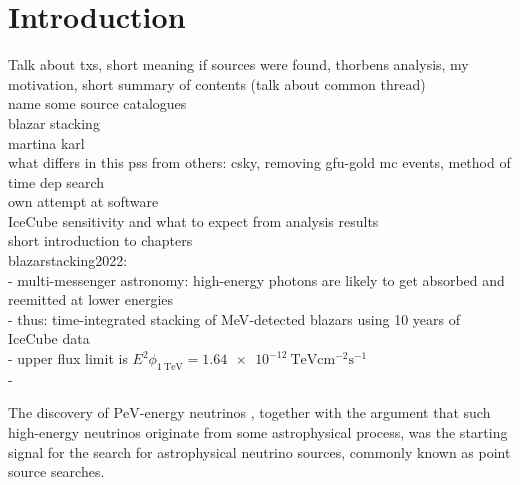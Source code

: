 \chapter{Introduction}
Talk about txs, short meaning if sources were found, thorbens analysis, my motivation, short summary of contents (talk about common thread)\\

name some source catalogues\\
blazar stacking\\
martina karl\\
what differs in this pss from others: csky, removing gfu-gold mc events, method of time dep search\\
own attempt at software\\
IceCube sensitivity and what to expect from analysis results\\
short introduction to chapters\\

blazarstacking2022:\\
- multi-messenger astronomy: high-energy photons are likely to get absorbed and reemitted at lower energies\\
- thus: time-integrated stacking of MeV-detected blazars using 10 years of IceCube data\\
- upper flux limit is $E^2\phi_{\SI{1}{\tera\electronvolt}}=\SI{1.64e-12}{\tera\electronvolt\centi\meter\tothe{-2}\second\tothe{-1}}$\\
- \cite{blazar_stacking_2020}

The discovery of $\si{\peta\electronvolt}$-energy neutrinos \cite{pev_neutrino}, together with the argument that such high-energy neutrinos originate from some astrophysical process, was the starting signal for the search for astrophysical neutrino sources, commonly known as point source searches.

